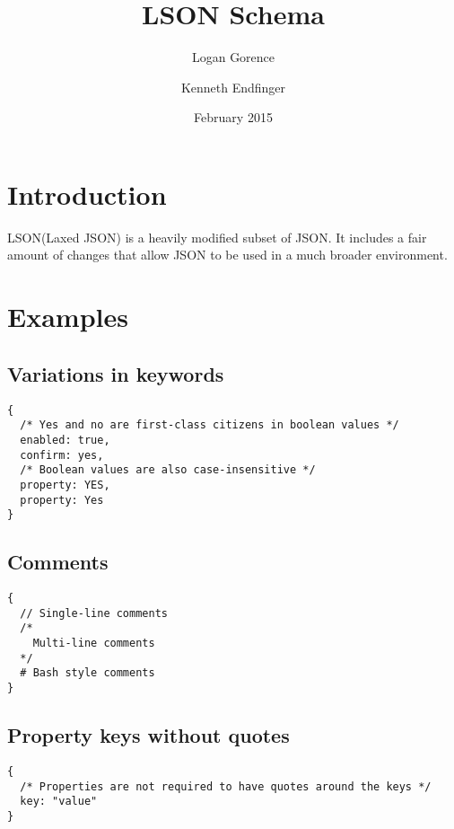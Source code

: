 \documentclass[12pt]{article}
\begin{document}
\title{LSON Schema}
\author{Logan Gorence \and Kenneth Endfinger}
\date{February 2015}
\maketitle
{}
\newpage

\tableofcontents
\newpage

\section{Introduction}
LSON(Laxed JSON) is a heavily modified subset of JSON. It includes a fair amount of changes that allow JSON to be used in a much  broader environment.
\section{Examples}
\subsection{Variations in keywords}
\begin{lstlisting}
{
  /* Yes and no are first-class citizens in boolean values */
  enabled: true,
  confirm: yes,
  /* Boolean values are also case-insensitive */
  property: YES,
  property: Yes
}
\end{lstlisting}
\subsection{Comments}
\begin{lstlisting}
{
  // Single-line comments
  /*
    Multi-line comments
  */
  # Bash style comments
}
\end{lstlisting}
\subsection{Property keys without quotes}
\begin{lstlisting}
{
  /* Properties are not required to have quotes around the keys */
  key: "value"
}
\end{lstlisting}
\end{document}
